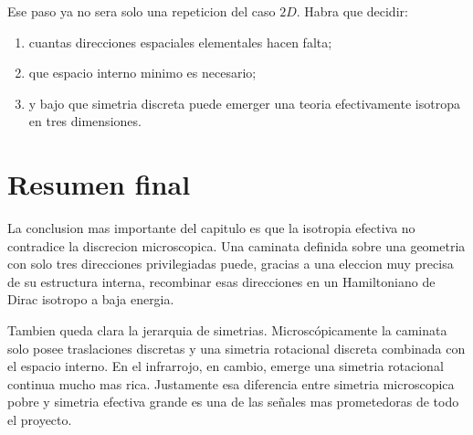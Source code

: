 Ese paso ya no sera solo una repeticion del caso \(2D\). Habra que decidir:
\begin{enumerate}[label=\arabic*.]
    \item cuantas direcciones espaciales elementales hacen falta;
    \item que espacio interno minimo es necesario;
    \item y bajo que simetria discreta puede emerger una teoria efectivamente isotropa en tres dimensiones.
\end{enumerate}

\section{Resumen final}
La conclusion mas importante del capitulo es que la isotropia efectiva no contradice la discrecion microscopica. Una caminata definida sobre una geometria con solo tres direcciones privilegiadas puede, gracias a una eleccion muy precisa de su estructura interna, recombinar esas direcciones en un Hamiltoniano de Dirac isotropo a baja energia.

Tambien queda clara la jerarquia de simetrias. Microscópicamente la caminata solo posee traslaciones discretas y una simetria rotacional discreta combinada con el espacio interno. En el infrarrojo, en cambio, emerge una simetria rotacional continua mucho mas rica. Justamente esa diferencia entre simetria microscopica pobre y simetria efectiva grande es una de las se\~nales mas prometedoras de todo el proyecto.
